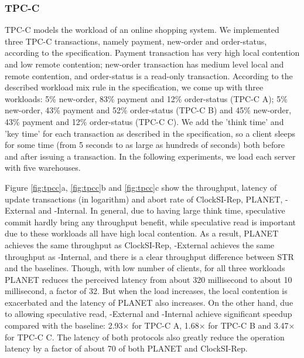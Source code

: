 \subsubsection{TPC-C}
TPC-C \cite{tpcc} models the workload of an online shopping system. We implemented three TPC-C transactions, namely payment, new-order and order-status, according to the specification. Payment transaction has very high local contention and low remote contention; new-order transaction has medium level local and remote contention, and order-status is a read-only transaction. According to the described workload mix rule in the specification, we come up with three workloads: 5\% new-order, 83\% payment and 12\% order-status (TPC-C A); 5\% new-order, 43\% payment and 52\% order-status (TPC-C B) and 45\% new-order, 43\% payment and 12\% order-status (TPC-C C). We add the 'think time' and 'key time' for each transaction as described in the specification, so a client sleeps for some time (from 5 seconds to as large as hundreds of seconds) both before and after issuing a transaction. In the following experiments, we load each server with five warehouses.

Figure \ref{fig:tpcc}a, \ref{fig:tpcc}b and \ref{fig:tpcc}c show the throughput, latency of update transactions (in logarithm) and abort rate of ClockSI-Rep, PLANET, {\specula}-External and {\specula}-Internal. In general, due to having large think time, speculative commit hardly bring any throughput benefit, while speculative read is important due to these workloads all have high local contention. As a result, PLANET achieves the same throughput as ClockSI-Rep, {\specula}-External achieves the same throughput as {\specula}-Internal, and there is a clear throughput difference between STR and the baselines. Though, with low number of clients, for all three workloads PLANET reduces the perceived latency from about 320 millisecond to about 10 millisecond, a factor of 32. But when the load increases, the local contention is exacerbated and the latency of PLANET also increases. On the other hand, due to allowing speculative read, {\specula}-External and {\specula-Internal} achieve significant speedup compared with the baseline: 2.93$\times$ for TPC-C A, 1.68$\times$ for TPC-C B and 3.47$\times$ for TPC-C C. The latency of both {\specula} protocols also greatly reduce the operation latency by a factor of about 70 of both PLANET and ClockSI-Rep.


